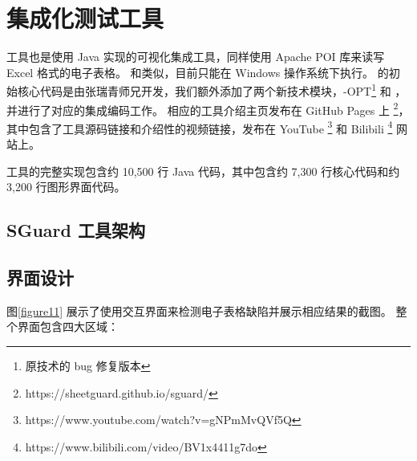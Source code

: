 \section{集成化测试工具 \sg }
\sg 工具也是使用 Java 实现的可视化集成工具，同样使用 Apache POI 库来读写 Excel 格式的电子表格。
和\wa 类似，目前只能在 Windows 操作系统下执行。
\sg 的初始核心代码是由张瑞青师兄开发，我们额外添加了两个新技术模块，\cu-OPT\footnote{原\cu 技术的 bug 修复版本} 和 \wa ，并进行了对应的集成编码工作。
相应的工具介绍主页发布在 GitHub Pages 上 \footnote{https://sheetguard.github.io/sguard/}，其中包含了工具源码链接和介绍性的视频链接，发布在 YouTube \footnote{https://www.youtube.com/watch?v=gNPmMvQVf5Q} 和 Bilibili \footnote{https://www.bilibili.com/video/BV1x4411g7do} 网站上。

\sg 工具的完整实现包含约 10,500 行 Java 代码，其中包含约 7,300 行核心代码和约 3,200 行图形界面代码。

\subsection{SGuard 工具架构}


\subsection{界面设计}

% 



% 
图\ref{figure11} 展示了\sg 使用交互界面来检测电子表格缺陷并展示相应结果的截图。
整个界面包含四大区域：

